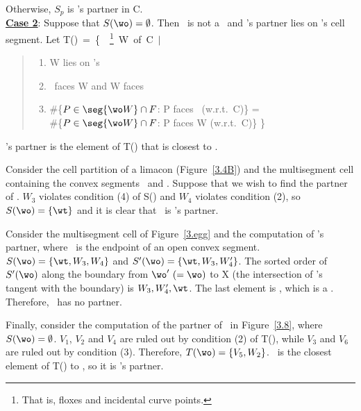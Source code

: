 \begin{theorem}
Otherwise, $S_{p}$ is \wo's partner in C.\\
%
\underline{{\bf Case 2}}: Suppose that $S(\wo) = \emptyset$.
Then \wo\ is not a \pseudo\ and
\wo's partner lies on \wo's cell segment.
Let T(\wo)~=~\{~\original~\wallpoints\footnote{That is, floxes and incidental 
curve points.}~W~of~C~$\mid$
\begin{quote}
\begin{enumerate}
   \item W lies on \wo's \cellsegment
   \item \wo\ faces W and W faces \wo
   \item \#\{$P \in \seg{\wo W} \cap F$: P faces \wo\ (w.r.t.\ C)\} = \\
\#\{$P \in \seg{\wo W} \cap F$: P faces W (w.r.t.\ C)\} \}
\end{enumerate}
\end{quote}
\wo's partner is the element of T(\wo) that is closest to \wo.
\end{theorem}
%
%
\begin{example}
Consider the cell partition of a limacon (Figure~\ref{3.4B})
and the multisegment cell containing the convex segments \wwa\ and
.
Suppose that we wish to find the partner of \wo.
$W_{3}$ violates condition (4) of S(\wo) and $W_{4}$ violates condition (2),
so $S(\wo) = \{\wt\}$ and it is clear that \wt\ is \wo's partner.

Consider the multisegment cell of Figure~\ref{3.egg} and the computation
of \wo's partner, where \wo\ is the endpoint of an open convex segment.\\
\mbox{$S(\wo) = \{\wt,W_{3},W_{4}\}$} and
\mbox{$S'(\wo) = \{\wt,W_{3},W_{4}'\}$}.
The sorted order of $S'(\wo)$ along the boundary from $\wo '\ (=\wo)$ to X
(the intersection of \wo's tangent with the boundary) is $W_{3},W_{4}',\wt$.
The last element is \wt, which is a \artificialcurvepoint.
Therefore, \wo\ has no partner.


Finally, consider the computation of the partner of \wo\ in Figure~\ref{3.8},
where $S(\wo) = \emptyset$.
$V_{1}$, $V_{2}$ and $V_{4}$ are ruled out by condition (2) of T(\wo),
while $V_{3}$ and $V_{6}$ are ruled out by condition (3).
Therefore, $T(\wo) = \{V_{5},W_{2}\}$.
\wt\ is the closest element of T(\wo) to \wo, so it is \wo's partner.
\end{example}
